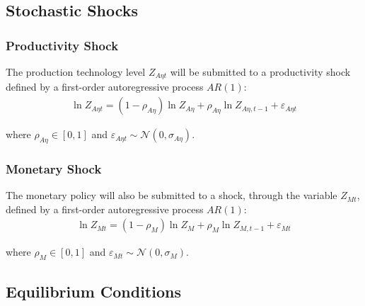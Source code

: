 \documentclass[
	thesis.tex
	]{subfiles}
\begin{document}

\subsection{Stochastic Shocks}\label{sec:reg-stochastic-shocks}

\subsubsection*{Productivity Shock} \label{sec:reg-productivity-shock}

The production technology level $Z_{A\eta t}$ will be submitted to a productivity shock defined by a first-order autoregressive process $AR(1)$:
\begin{align}
	\ln{Z_{A\eta t}} = (1-\rho_{A\eta})\ln{Z_{A\eta}} + \rho_{A\eta}\ln{Z_{A\eta,t-1}} + \varepsilon_{A\eta t} \label{eq:reg-productivity-shock}
\end{align}

where $\rho_{A\eta} \in [0,1]$ and $\varepsilon_{A\eta t} \sim \mathscr{N}(0,\sigma_{A\eta})$.

\subsubsection*{Monetary Shock} \label{sec:reg-monetary-shock}

The monetary policy will also be submitted to a shock, through the variable $Z_{Mt}$, defined by a first-order autoregressive process $AR(1)$:
\begin{align}
	\ln{Z_{Mt}} = (1-\rho_M)\ln{Z_{M}} + \rho_M\ln{Z_{M,t-1}} + \varepsilon_{Mt} \label{eq:reg-monetary-shock}
\end{align}

where $\rho_M \in [0,1]$ and $\varepsilon_{Mt} \sim \mathscr{N}(0,\sigma_M)$.


\subsection{Equilibrium Conditions}

\end{document}
